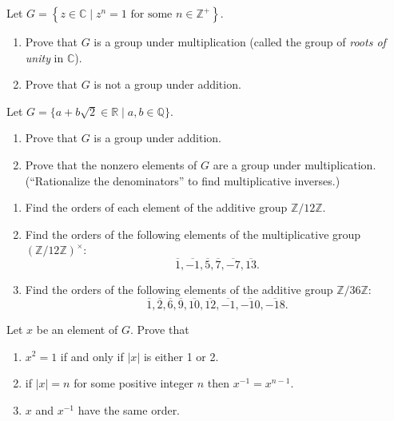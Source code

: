 \documentclass[
    11pt,a4paper,
]{exam}
\begin{document}
\begin{questions}
    \question
    Let \(G=\left\{z \in \mathbb{C} \mid z^n=1 \text{ for some }n \in \mathbb{Z}^{+}\right\}\).
    \begin{enumerate}[label=(\alph*)]
        \item Prove that \(G\) is a group under multiplication (called the group of \textit{roots of unity} in \(\mathbb{C}\)).
        \item Prove that \(G\) is not a group under addition.
    \end{enumerate}
    
    
    \question
    Let \(G=\{a+b \sqrt{2} \in \mathbb{R} \mid a, b \in \mathbb{Q}\}\).
    \begin{enumerate}[label=(\alph*)]
        \item Prove that \(G\) is a group under addition.
        \item Prove that the nonzero elements of \(G\) are a group under multiplication. (``Rationalize the denominators'' to find multiplicative inverses.)
    \end{enumerate}
    
    
    \question
    \begin{enumerate}[label=(\roman*)]
        \item Find the orders of each element of the additive group \(\mathbb{Z} / 12 \mathbb{Z}\).
        \item Find the orders of the following elements of the multiplicative group \((\mathbb{Z} / 12 \mathbb{Z})^\times\):
    \[\overline{1}, \overline{-1}, \overline{5}, \overline{7}, \overline{-7}, \overline{13}.\]
    
    \item Find the orders of the following elements of the additive group \(\mathbb{Z} / 36 \mathbb{Z}\):
    \[ \overline{1}, \overline{2}, \overline{6}, \overline{9}, \overline{10}, \overline{12}, \overline{-1},\overline{-10},\overline{-18}.\]
    

    \end{enumerate}
     
    
    \question
    Let \(x\) be an element of \(G\). Prove that 
    \begin{enumerate}[label=(\roman*)]
        \item \(x^2=1\) if and only if \(|x|\) is either 1 or 2.
        \item if \(|x|=n\) for some positive integer \(n\) then \(x^{-1}=x^{n-1}\).
        \item \(x\) and \(x^{-1}\) have the same order.
    \end{enumerate}
    

\end{questions}
\end{document}
